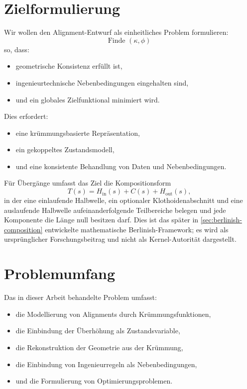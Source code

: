\section{Zielformulierung}

Wir wollen den Alignment-Entwurf als einheitliches Problem formulieren:
\[
\text{Finde } (\kappa,\phi)
\]
so, dass:
\begin{itemize}
\item geometrische Konsistenz erfüllt ist,
\item ingenieurtechnische Nebenbedingungen eingehalten sind,
\item und ein globales Zielfunktional minimiert wird.
\end{itemize}

Dies erfordert:
\begin{itemize}
\item eine krümmungsbasierte Repräsentation,
\item ein gekoppeltes Zustandsmodell,
\item und eine konsistente Behandlung von Daten und Nebenbedingungen.
\end{itemize}

Für Übergänge umfasst das Ziel die Kompositionsform
\[
T(s)=H_{\mathrm{in}}(s)+C(s)+H_{\mathrm{out}}(s),
\]
in der eine einlaufende Halbwelle, ein optionaler Klothoidenabschnitt und eine
auslaufende Halbwelle aufeinanderfolgende Teilbereiche belegen und jede
Komponente die Länge null besitzen darf. Dies ist das später in
\cref{sec:berlinish-composition} entwickelte mathematische
Berlinish-Framework; es wird als ursprünglicher Forschungsbeitrag und nicht
als Kernel-Autorität dargestellt.

\section{Problemumfang}

Das in dieser Arbeit behandelte Problem umfasst:
\begin{itemize}
\item die Modellierung von Alignments durch Krümmungsfunktionen,
\item die Einbindung der Überhöhung als Zustandsvariable,
\item die Rekonstruktion der Geometrie aus der Krümmung,
\item die Einbindung von Ingenieurregeln als Nebenbedingungen,
\item und die Formulierung von Optimierungsproblemen.
\end{itemize}

